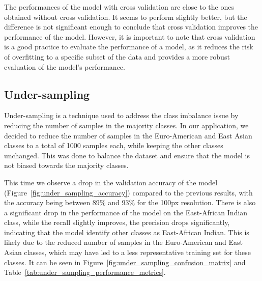 The performances of the model with cross validation are close to the ones obtained without cross validation. It seems to perform slightly
better, but the difference is not significant enough to conclude that cross validation improves the performance of the model. However, it is
important to note that cross validation is a good practice to evaluate the performance of a model, as it reduces the risk of overfitting
to a specific subset of the data and provides a more robust evaluation of the model's performance.

\subsection{Under-sampling}
\label{subsec:under_sampling}

Under-sampling is a technique used to address the class imbalance issue by reducing the number of samples in the majority classes. In our
application, we decided to reduce the number of samples in the Euro-American and East Asian classes to a total of 1000 samples each, while keeping
the other classes unchanged. This was done to balance the dataset and ensure that the model is not biased towards the majority classes.

\label{subsubsec:results_under_sampling}

This time we observe a drop in the validation accuracy of the model (Figure~\ref{fig:under_sampling_accuracy}) compared to the previous results,
with the accuracy being between 89\% and 93\% for the 100px resolution. There is also a significant drop in the performance of the model
on the East-African Indian class, while the recall slightly improves, the precision drops significantly, indicating that the model identify
other classes as East-African Indian. This is likely due to the reduced number of samples in the Euro-American and East Asian classes,
which may have led to a less representative training set for these classes. It can be seen in Figure~\ref{fig:under_sampling_confusion_matrix}
and Table~\ref{tab:under_sampling_performance_metrics}.

